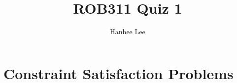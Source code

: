 \documentclass{article}
\title{ROB311 Quiz 1}
\author{Hanhee Lee}
\begin{document}
\maketitle

\tableofcontents
\newpage

\section{Constraint Satisfaction Problems}

\end{document}

